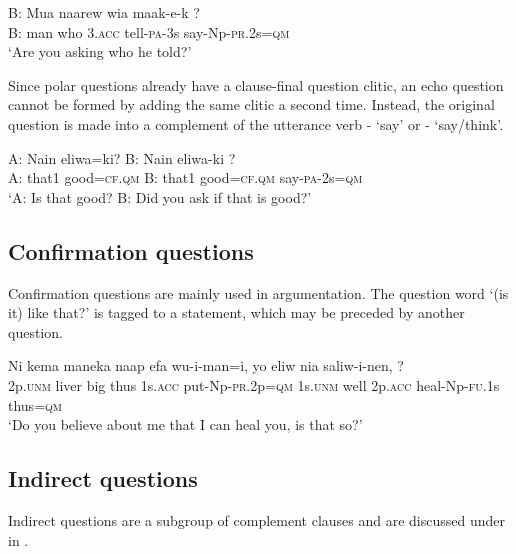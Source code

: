\ea%
\label{ex:7:x1192}
\gll B:  Mua  naarew  wia  maak-e-k  ? \\
B:  man  who  3.\textsc{acc}  tell-\textsc{pa}-3s  say-Np-\textsc{pr}.2s=\textsc{qm}      \\
\glt `Are you asking who he told?'
\z





Since polar questions already have a clause-final question clitic, an echo question cannot be formed by adding the same clitic a second time. Instead, the original question is made into a complement of the utterance verb - `say' or - `say/think'. 

\ea%
\label{ex:7:x1193}
\gll A:  Nain  eliwa=ki?  B:  Nain  eliwa-ki  ? \\
A:  that1  good=\textsc{cf}.\textsc{qm}  B:  that1  good=\textsc{cf}.\textsc{qm}  say-\textsc{pa}-2s=\textsc{qm}      \\
\glt `A: Is that good?  B: Did you ask if that is good?'
\z





\subsection{Confirmation questions}
{}
Confirmation questions are mainly used in argumentation. The question word   `(is it) like that?' is tagged to a statement, which may be preceded by another question. 

\ea%
\label{ex:7:x1188}
\gll Ni  kema  maneka  naap  efa  wu-i-man=i, yo  eliw  nia  saliw-i-nen,  ? \\
2p.\textsc{unm}  liver  big  thus  1s.\textsc{acc}  put-Np-\textsc{pr}.2p=\textsc{qm}  1s.\textsc{unm}  well  2p.\textsc{acc}  heal-Np-\textsc{fu}.1s  thus=\textsc{qm}    \\
\glt `Do you believe about me that I can heal you, is that so?'
\z









\subsection{Indirect questions}
{}
Indirect questions are a subgroup of complement clauses and are discussed under  in  .

